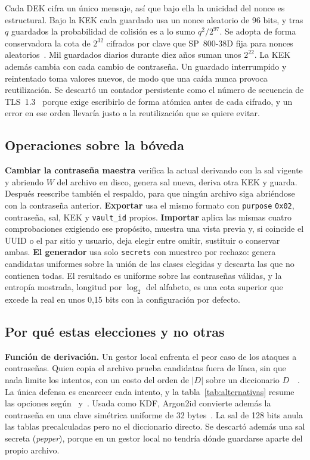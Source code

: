 \documentclass[11pt,letterpaper]{article}
\newcommand{\code}[1]{\texttt{#1}}
\begin{document}
Cada DEK cifra un único mensaje, así que bajo ella la unicidad del nonce es estructural. Bajo la KEK cada guardado usa un nonce aleatorio de 96 bits, y tras $q$ guardados la probabilidad de colisión es a lo sumo $q^2/2^{97}$. Se adopta de forma conservadora la cota de $2^{32}$ cifrados por clave que SP~800-38D fija para nonces aleatorios~\cite{sp80038d}. Mil guardados diarios durante diez años suman unos $2^{22}$. La KEK además cambia con cada cambio de contraseña. Un guardado interrumpido y reintentado toma valores nuevos, de modo que una caída nunca provoca reutilización. Se descartó un contador persistente como el número de secuencia de TLS~1.3~\cite{protocols} porque exige escribirlo de forma atómica antes de cada cifrado, y un error en ese orden llevaría justo a la reutilización que se quiere evitar.

\subsection{Operaciones sobre la bóveda}

\textbf{Cambiar la contraseña maestra} verifica la actual derivando con la sal vigente y abriendo $W$ del archivo en disco, genera sal nueva, deriva otra KEK y guarda. Después reescribe también el respaldo, para que ningún archivo siga abriéndose con la contraseña anterior. \textbf{Exportar} usa el mismo formato con \code{purpose} \code{0x02}, contraseña, sal, KEK y \code{vault\_id} propios. \textbf{Importar} aplica las mismas cuatro comprobaciones exigiendo ese propósito, muestra una vista previa y, si coincide el UUID o el par sitio y usuario, deja elegir entre omitir, sustituir o conservar ambas. \textbf{El generador} usa solo \code{secrets} con muestreo por rechazo: genera candidatas uniformes sobre la unión de las clases elegidas y descarta las que no contienen todas. El resultado es uniforme sobre las contraseñas válidas, y la entropía mostrada, longitud por $\log_2$ del alfabeto, es una cota superior que excede la real en unos 0,15 bits con la configuración por defecto.

\subsection{Por qué estas elecciones y no otras}\label{sec:justificacion}

\textbf{Función de derivación.} Un gestor local enfrenta el peor caso de los ataques a contraseñas. Quien copia el archivo prueba candidatas fuera de línea, sin que nada limite los intentos, con un costo del orden de $|D|$ sobre un diccionario $D$~\cite[§18.4.4]{boneh}~\cite{protocols}. La única defensa es encarecer cada intento, y la tabla~\ref{tab:alternativas} resume las opciones según~\cite[§18.4]{boneh} y~\cite[§1]{rfc9106}. Usada como KDF, Argon2id convierte además la contraseña en una clave simétrica uniforme de 32 bytes~\cite[§8.10]{boneh}. La sal de 128 bits anula las tablas precalculadas pero no el diccionario directo. Se descartó además una sal secreta (\emph{pepper}), porque en un gestor local no tendría dónde guardarse aparte del propio archivo.
\end{document}
